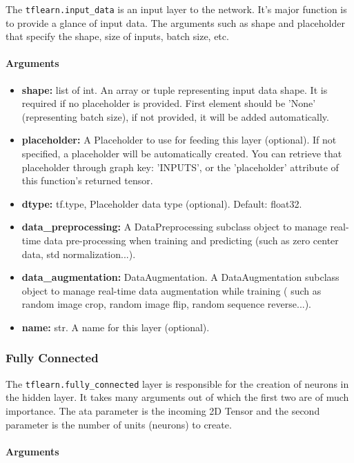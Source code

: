 The \texttt{tflearn.input\_data} is an input layer to the network. It’s major function is to provide a glance of input data. The arguments such as shape and placeholder that specify the shape, size of inputs, batch size, etc.

\paragraph{Arguments}

\begin{itemize}
    \item \textbf{shape:} list of int. An array or tuple representing input data shape. It is required if no placeholder is provided. First element should be 'None' (representing batch size), if not provided, it will be added automatically.
    \item \textbf{placeholder:} A Placeholder to use for feeding this layer (optional). If not specified, a placeholder will be automatically created. You can retrieve that placeholder through graph key: 'INPUTS', or the 'placeholder' attribute of this function's returned tensor.
    \item \textbf{dtype:} tf.type, Placeholder data type (optional). Default: float32.
    \item \textbf{data\_preprocessing:} A DataPreprocessing subclass object to manage real-time data pre-processing when training and predicting (such as zero center data, std normalization...).
    \item \textbf{data\_augmentation:} DataAugmentation. A DataAugmentation subclass object to manage real-time data augmentation while training ( such as random image crop, random image flip, random sequence reverse...).
    \item \textbf{name:} str. A name for this layer (optional).
\end{itemize}

\subsubsection{Fully Connected}

The \texttt{tflearn.fully\_connected} layer is responsible for the creation of neurons in the hidden layer. It takes many arguments out of which the first two are of much importance. The ata parameter is  the incoming 2D Tensor and the second parameter is the number of units (neurons) to create.

\paragraph{Arguments}

